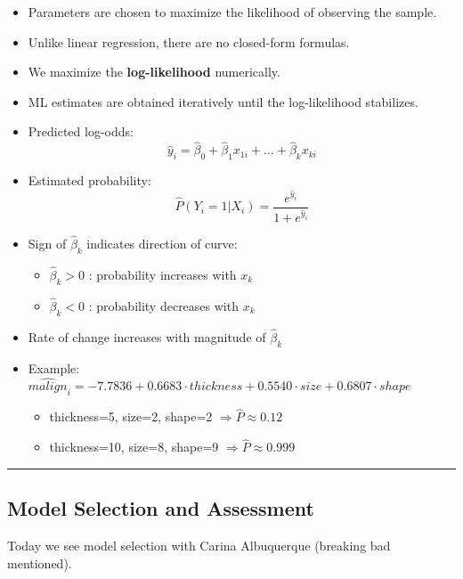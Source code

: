 \begin{itemize}
    \item Parameters are chosen to maximize the likelihood of observing the sample.
    \item Unlike linear regression, there are no closed-form formulas.
    \item We maximize the \textbf{log-likelihood} numerically.
    \item ML estimates are obtained iteratively until the log-likelihood stabilizes.
    \item Predicted log-odds:
    \[
        \hat{y}_i = \hat{\beta}_0 + \hat{\beta}_1 x_{1i} + \dots + \hat{\beta}_k x_{ki}
    \]
    \item Estimated probability:
    \[
        \hat{P}(Y_i=1|X_i) = \frac{e^{\hat{y}_i}}{1+e^{\hat{y}_i}}
    \]
    \item Sign of \(\hat{\beta}_k\) indicates direction of curve:
    \begin{itemize}
        \item \(\hat{\beta}_k > 0\) : probability increases with \(x_k\)
        \item \(\hat{\beta}_k < 0\) : probability decreases with \(x_k\)
    \end{itemize}
    \item Rate of change increases with magnitude of \(\hat{\beta}_k\)
    \item Example: \(\hat{malign}_i = -7.7836 + 0.6683 \cdot thickness + 0.5540 \cdot size + 0.6807 \cdot shape\)
    \begin{itemize}
        \item thickness=5, size=2, shape=2 \(\Rightarrow \hat{P} \approx 0.12\)
        \item thickness=10, size=8, shape=9 \(\Rightarrow \hat{P} \approx 0.999\)
    \end{itemize}
\end{itemize}



\vspace{10pt}

\hrule

\vspace{10pt}

\subsection{Model Selection and Assessment}

Today we see model selection with Carina Albuquerque (breaking bad mentioned).

